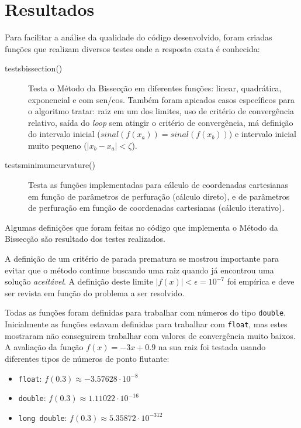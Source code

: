 \documentclass[final,3p,12pt]{elsarticle}
\begin{document}
    \section{Resultados}
    
    Para facilitar a análise da qualidade do código desenvolvido, foram criadas funções que realizam diversos testes onde a resposta exata é conhecida:

    \begin{description}
        \item[tests\textunderscore bissection()] Testa o Método da Bissecção em diferentes funções: linear, quadrática, exponencial e com sen/cos. Também foram apicados casos específicos para o algoritmo tratar: raiz em um dos limites, uso de critério de convergência relativo, saída do \emph{loop} sem atingir o critério de convergência, má definição do intervalo inicial ($sinal(f(x_a)) = sinal(f(x_b))$) e intervalo inicial muito pequeno ($|x_b - x_a| < \zeta$).
        
        \item[tests\textunderscore minimum\textunderscore curvature()] Testa as funções implementadas para cálculo de coordenadas cartesianas em função de parâmetros de perfuração (cálculo direto), e de parâmetros de perfuração em função de coordenadas cartesianas (cálculo iterativo).
    \end{description}

    Algumas definições que foram feitas no código que implementa o Método da Bissecção são resultado dos testes realizados.

    A definição de um critério de parada prematura se mostrou importante para evitar que o método continue buscando uma raiz quando já encontrou uma solução \emph{aceitável}. A definição deste limite $|f(x)| < \epsilon = 10^{-7}$ foi empírica e deve ser revista em função do problema a ser resolvido.
    
    Todas as funções foram definidas para trabalhar com números do tipo \verb|double|. Inicialmente as funções estavam definidas para trabalhar com \verb|float|, mas estes mostraram não conseguirem trabalhar com valores de convergência muito baixos. A avaliação da função $f(x) = -3x+0.9$ na sua raiz foi testada usando diferentes tipos de números de ponto flutante:

    \begin{itemize}
        \item \verb|float|: $f(0.3) \approx -3.57628 \cdot 10^{-8}$ 
        \item \verb|double|: $f(0.3) \approx 1.11022 \cdot 10^{-16}$ 
        \item \verb|long double|: $f(0.3) \approx 5.35872 \cdot 10^{-312}$ 
    \end{itemize}
    
\end{document}
